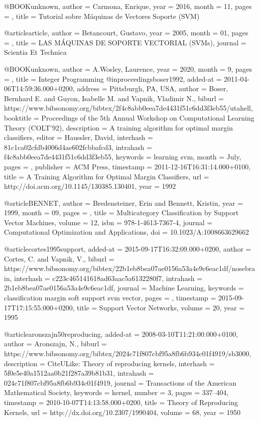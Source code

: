 

\begin{thebibliography}{widestlabel}
@BOOK{unknown,
	author = {Carmona, Enrique},
	year = {2016},
	month = {11},
	pages = {},
	title = {Tutorial sobre M\'aquinas de Vectores Soporte (SVM)}
}

@article{article,
	author = {Betancourt, Gustavo},
	year = {2005},
	month = {01},
	pages = {},
	title = {LAS M\'AQUINAS DE SOPORTE VECTORIAL (SVMs)},
	journal = {Scientia Et Technica}
}

@BOOK{unknown,
	author = {A.Wosley, Laurence},
	year = {2020},
	month = {9},
	pages = {},
	title = {Integer Programming}
}
@inproceedings{boser1992,
	added-at = {2011-04-06T14:59:36.000+0200},
	address = {Pittsburgh, PA, USA},
	author = {Boser, Bernhard E. and Guyon, Isabelle M. and Vapnik, Vladimir N.},
	biburl = {https://www.bibsonomy.org/bibtex/2f4c8abb0eea7de4431f51c6dd3f3eb55/utahell},
	booktitle = {Proceedings of the 5th Annual Workshop on Computational Learning Theory (COLT'92)},
	description = {A training algorithm for optimal margin classifiers},
	editor = {Haussler, David},
	interhash = {81c1ca02cfdb4006d4ae602fcbbafcd3},
	intrahash = {f4c8abb0eea7de4431f51c6dd3f3eb55},
	keywords = {learning svm},
	month = {July},
	pages = {},
	publisher = {ACM Press},
	timestamp = {2011-12-16T16:31:14.000+0100},
	title = {A Training Algorithm for Optimal Margin Classifiers},
	url = {http://doi.acm.org/10.1145/130385.130401},
	year = 1992
}

@article{BENNET,
	author = {Bredensteiner, Erin and Bennett, Kristin},
	year = {1999},
	month = {09},
	pages = {},
	title = {Multicategory Classification by Support Vector Machines},
	volume = {12},
	isbn = {978-1-4613-7367-4},
	journal = {Computational Optimization and Applications},
	doi = {10.1023/A:1008663629662}
}

@article{cortes1995support,
	added-at = {2015-09-17T16:32:09.000+0200},
	author = {Cortes, C. and Vapnik, V.},
	biburl = {https://www.bibsonomy.org/bibtex/22b1eb8bea07ae0156a53a4e9c6eac1df/nosebrain},
	interhash = {c223c465141618ad63aac5a6132280f7},
	intrahash = {2b1eb8bea07ae0156a53a4e9c6eac1df},
	journal = {Machine Learning},
	keywords = {classification margin soft support svm vector},
	pages = {},
	timestamp = {2015-09-17T17:15:55.000+0200},
	title = {Support Vector Networks},
	volume = 20,
	year = 1995
}

@article{aronszajn50reproducing,
	added-at = {2008-03-10T11:21:00.000+0100},
	author = {Aronszajn, N.},
	biburl = {https://www.bibsonomy.org/bibtex/2024c71f807cbf95a8fb6b934c01f4919/sb3000},
	description = {CiteULike: Theory of reproducing kernels},
	interhash = {5f0e5e40a1512aa0b21f287a39b81b31},
	intrahash = {024c71f807cbf95a8fb6b934c01f4919},
	journal = {Transactions of the American Mathematical Society},
	keywords = {kernel},
	number = 3,
	pages = {337--404},
	timestamp = {2010-10-07T14:13:58.000+0200},
	title = {Theory of Reproducing Kernels},
	url = {http://dx.doi.org/10.2307/1990404},
	volume = 68,
	year = 1950
}


\end{thebibliography}
